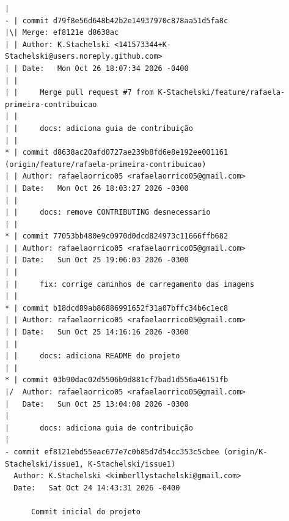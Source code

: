 \documentclass[12pt]{article}
\begin{document}
\begin{lstlisting}
| 
- | commit d79f8e56d648b42b2e14937970c878aa51d5fa8c
|\| Merge: ef8121e d8638ac
| | Author: K.Stachelski <141573344+K-Stachelski@users.noreply.github.com>
| | Date:   Mon Oct 26 18:07:34 2026 -0400
| | 
| |     Merge pull request #7 from K-Stachelski/feature/rafaela-primeira-contribuicao
| |     
| |     docs: adiciona guia de contribuição
| | 
* | commit d8638ac20afd0727ae239b8fd6e8e192ee001161 (origin/feature/rafaela-primeira-contribuicao)
| | Author: rafaelaorrico05 <rafaelaorrico05@gmail.com>
| | Date:   Mon Oct 26 18:03:27 2026 -0300
| | 
| |     docs: remove CONTRIBUTING desnecessario
| | 
* | commit 77053bb480e9c0970d0dcd824973c11666ffb682
| | Author: rafaelaorrico05 <rafaelaorrico05@gmail.com>
| | Date:   Sun Oct 25 19:06:03 2026 -0300
| | 
| |     fix: corrige caminhos de carregamento das imagens
| | 
* | commit b18dcd89ab86886991652f31a07bffc34b6c1ec8
| | Author: rafaelaorrico05 <rafaelaorrico05@gmail.com>
| | Date:   Sun Oct 25 14:16:16 2026 -0300
| | 
| |     docs: adiciona README do projeto
| | 
* | commit 03b90dac02d5506b9d881cf7bad1d556a46151fb
|/  Author: rafaelaorrico05 <rafaelaorrico05@gmail.com>
|   Date:   Sun Oct 25 13:04:08 2026 -0300
|   
|       docs: adiciona guia de contribuição
| 
- commit ef8121ebd55eac677e7c0b85d7d54cc353c5cbee (origin/K-Stachelski/issue1, K-Stachelski/issue1)
  Author: K.Stachelski <kimberllystachelski@gmail.com>
  Date:   Sat Oct 24 14:43:31 2026 -0400
  
      Commit inicial do projeto
\end{lstlisting}
\end{document}
